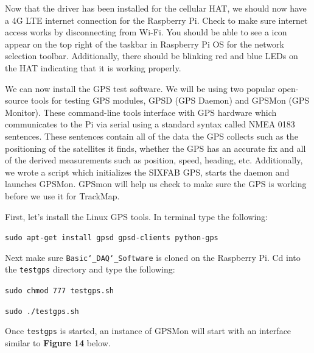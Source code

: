 \documentclass[12pt, letterpaper]{article}
\begin{document}
{{\par Now that the driver has been installed for the cellular HAT, we should now have a 4G LTE internet connection for the Raspberry Pi. Check to make sure internet access works by disconnecting from Wi-Fi. You should be able to see a icon appear on the top right of the taskbar in Raspberry Pi OS for the network selection toolbar. Additionally, there should be blinking red and blue LEDs on the HAT indicating that it is working properly. 

\par We can now install the GPS test software. We will be using two popular open-source tools for testing GPS modules, GPSD (GPS Daemon) and GPSMon (GPS Monitor). These command-line tools interface with GPS hardware which communicates to the Pi via  serial using a standard syntax called NMEA 0183 sentences. These sentences contain all of the data the GPS collects such as the positioning of the satellites it finds, whether the GPS has an accurate fix and all of the derived measurements such as position, speed, heading, etc. Additionally, we wrote a script which initializes the SIXFAB GPS, starts the daemon and launches GPSMon. GPSmon will help us check to make sure the GPS is working before we use it for TrackMap. 

\par First, let's install the Linux GPS tools. In terminal type the following: \\[1\baselineskip]

\par{\texttt{sudo apt-get install gpsd gpsd-clients python-gps}}\\[1\baselineskip]
\par Next make sure \texttt{Basic\char`_DAQ\char`_Software} is cloned on the Raspberry Pi.  Cd into the \texttt{testgps} directory and type the following:\\[1\baselineskip]

\par{\texttt{sudo chmod 777 testgps.sh}}\\
\par{\texttt{sudo ./testgps.sh}}\\[1\baselineskip]

\par Once \texttt{testgps} is started, an instance of GPSMon will start with an interface similar to \textbf{Figure 14} below. 

}}
\end{document}
